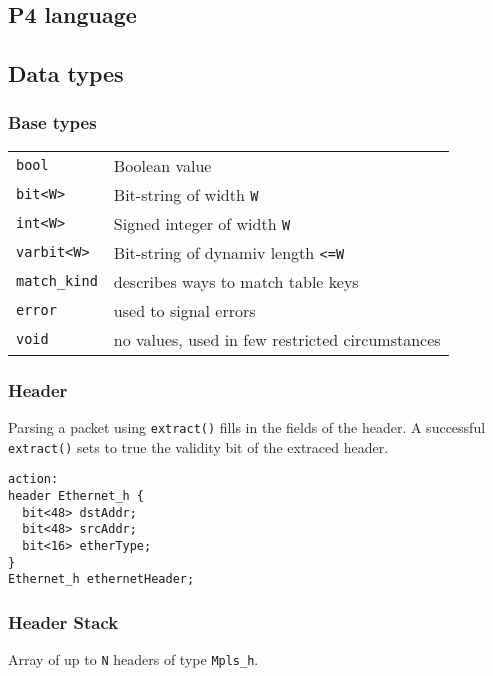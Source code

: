 \documentclass[a4paper, fontsize=8pt, landscape, DIV=1]{scrartcl}
\begin{document}
  \begin{multicols*}{3}
  \section{P4 language}
  \subsection{Data types}

  \subsubsection{Base types}

  \begin{tabularx}{\linewidth}{ l X}
    \lstinline[style=P4style]!bool! &
    Boolean value\\
    \lstinline[style=P4style]!bit<W>! &
    Bit-string of width \texttt{W}\\
    \lstinline[style=P4style]!int<W>! &
    Signed integer of width \texttt{W}\\
    \lstinline[style=P4style]!varbit<W>! &
    Bit-string of dynamiv length \texttt{<=W}\\
    \lstinline[style=P4style]!match_kind! &
    describes ways to match table keys\\
    \lstinline[style=P4style]!error! &
    used to signal errors\\
    \lstinline[style=P4style]!void! &
    no values, used in few restricted circumstances\\
  \end{tabularx}

  \subsubsection{Header}
  Parsing a packet using \texttt{extract()} fills in the fields of the header.
  A successful \texttt{extract()} sets to true the validity bit of the extraced header.

  \begin{lstlisting}[style=P4style]
action:
header Ethernet_h {
  bit<48> dstAddr;
  bit<48> srcAddr;
  bit<16> etherType;
}
Ethernet_h ethernetHeader;
\end{lstlisting}

  \subsubsection{Header Stack}
  Array of up to \texttt{N} headers of type \texttt{Mpls\_h}.


\end{multicols*}
\end{document}
